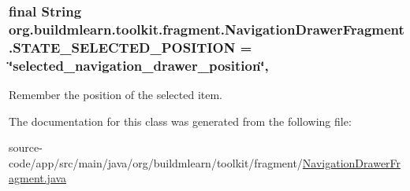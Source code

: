 \subsubsection[{\texorpdfstring{S\+T\+A\+T\+E\+\_\+\+S\+E\+L\+E\+C\+T\+E\+D\+\_\+\+P\+O\+S\+I\+T\+I\+ON}{STATE_SELECTED_POSITION}}]{\setlength{\rightskip}{0pt plus 5cm}final String org.\+buildmlearn.\+toolkit.\+fragment.\+Navigation\+Drawer\+Fragment.\+S\+T\+A\+T\+E\+\_\+\+S\+E\+L\+E\+C\+T\+E\+D\+\_\+\+P\+O\+S\+I\+T\+I\+ON = \char`\"{}selected\+\_\+navigation\+\_\+drawer\+\_\+position\char`\"{}\hspace{0.3cm}{\ttfamily [static]}, {\ttfamily [private]}}\hypertarget{classorg_1_1buildmlearn_1_1toolkit_1_1fragment_1_1NavigationDrawerFragment_a91333ab003a031fb45bfea43e364c6f9}{}\label{classorg_1_1buildmlearn_1_1toolkit_1_1fragment_1_1NavigationDrawerFragment_a91333ab003a031fb45bfea43e364c6f9}
Remember the position of the selected item. 

The documentation for this class was generated from the following file\+:\begin{DoxyCompactItemize}
\item 
source-\/code/app/src/main/java/org/buildmlearn/toolkit/fragment/\hyperlink{NavigationDrawerFragment_8java}{Navigation\+Drawer\+Fragment.\+java}\end{DoxyCompactItemize}
